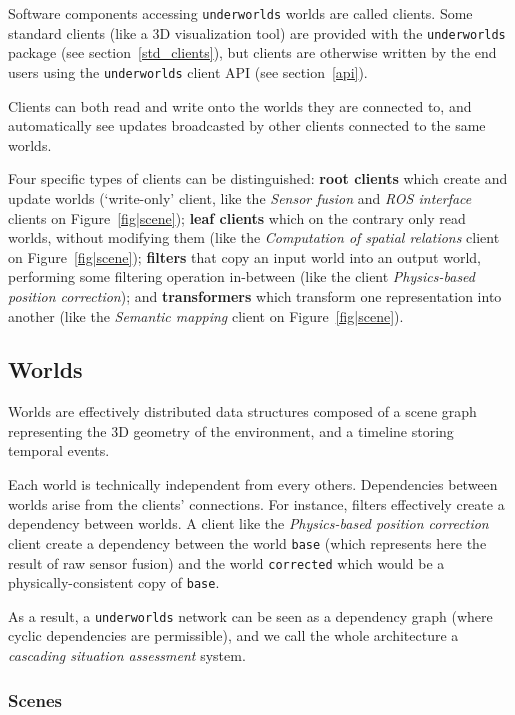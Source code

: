 \documentclass[letterpaper, 10 pt, conference]{ieeeconf}  %
\newcommand{\uwds}{{\tt underworlds}\xspace}
\begin{document}
Software components accessing \uwds worlds are called clients. Some standard
clients (like a 3D visualization tool) are provided with the \uwds package (see
section~\ref{std_clients}), but clients are otherwise written by the end users
using the \uwds client API (see section~\ref{api}).

Clients can both read and write onto the worlds they are connected to, and
automatically see updates broadcasted by other clients connected to the same
worlds.

Four specific types of clients can be distinguished: \textbf{root clients} which
create and update worlds (`write-only' client, like the \emph{Sensor fusion} and
\emph{ROS interface} clients on Figure~\ref{fig|scene}); \textbf{leaf clients}
which on the contrary only read worlds, without modifying them (like the
\emph{Computation of spatial relations} client on Figure~\ref{fig|scene});
\textbf{filters} that copy an input world into an output world, performing
some filtering operation in-between (like the client \textit{Physics-based
position correction}); and \textbf{transformers} which transform one
representation into another (like the \emph{Semantic mapping} client on
Figure~\ref{fig|scene}).

\subsection{Worlds}

Worlds are effectively distributed data structures composed of a scene graph
representing the 3D geometry of the environment, and a timeline storing temporal
events.

Each world is technically independent from every others. Dependencies between
worlds arise from the clients' connections. For instance, filters effectively
create a dependency between worlds. A client like the \textit{Physics-based
position correction} client create a dependency between the world {\tt base} (which
represents here the result of raw sensor fusion) and the world {\tt corrected}
which would be a physically-consistent copy of {\tt base}.

As a result, a \uwds network can be seen as a dependency graph (where
cyclic dependencies are permissible), and we call the whole architecture a
\emph{cascading situation assessment} system.

\subsubsection{Scenes}
\end{document}
